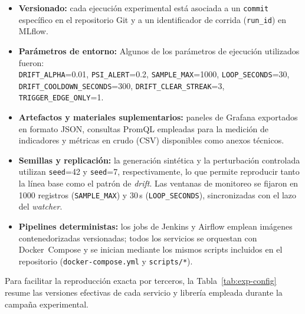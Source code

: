 \begin{itemize}
  \item \textbf{Versionado:} cada ejecución experimental está asociada a un \texttt{commit} específico en el repositorio Git y a un identificador de corrida (\texttt{run\_id}) en MLflow.

  \item \textbf{Parámetros de entorno:} Algunos de los parámetros de ejecución utilizados fueron:\\
  {\small
  \texttt{DRIFT\_ALPHA}=0.01, \texttt{PSI\_ALERT}=0.2, \texttt{SAMPLE\_MAX}=1000, \texttt{LOOP\_SECONDS}=30,\\
  \texttt{DRIFT\_COOLDOWN\_SECONDS}=300, \texttt{DRIFT\_CLEAR\_STREAK}=3, \texttt{TRIGGER\_EDGE\_ONLY}=1.
  }\normalsize

  \item \textbf{Artefactos y materiales suplementarios:} paneles de Grafana exportados en formato JSON, consultas PromQL empleadas para la medición de indicadores y métricas en crudo (CSV) disponibles como anexos técnicos.

  \item \textbf{Semillas y replicación:} la generación sintética y la perturbación controlada utilizan \texttt{seed}=42 y \texttt{seed}=7, respectivamente, lo que permite reproducir tanto la línea base como el patrón de \textit{drift}. Las ventanas de monitoreo se fijaron en 1000 registros (\texttt{SAMPLE\_MAX}) y 30\,s (\texttt{LOOP\_SECONDS}), sincronizadas con el lazo del \textit{watcher}.

  \item \textbf{Pipelines deterministas:} los jobs de Jenkins y Airflow emplean imágenes contenedorizadas versionadas; todos los servicios se orquestan con Docker~Compose y se inician mediante los mismos scripts incluidos en el repositorio (\texttt{docker-compose.yml} y \texttt{scripts/*}).
\end{itemize}



Para facilitar la reproducción exacta por terceros, la Tabla~\ref{tab:exp-config} resume las versiones efectivas de cada servicio y librería empleada durante la campaña experimental.

